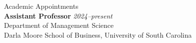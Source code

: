 \documentclass{resume} %
\begin{document}
\setcounter{page}{1}

\begin{rSection}{Academic Appointments}
\ \\
{\bf Assistant Professor} \hfill {\em 2024--present}\\ 
Department of Management Science\\
Darla Moore School of Business, University of South Carolina

\end{rSection}
\end{document}
